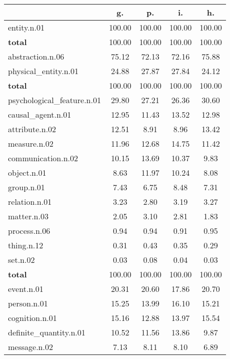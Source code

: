 \begin{table}[h!]
\begin{center}
\begin{tabular}{| l || c | c | c | c |}\hline
 & {\bf g.} & {\bf p.} & {\bf i.} & {\bf h.} \\\hline\hline
entity.n.01 & 100.00  & 100.00  & 100.00  & 100.00 \\\hline\hline
{{\bf total}} & 100.00  & 100.00  & 100.00  & 100.00 \\\hline\hline\hline
abstraction.n.06 & 75.12  & 72.13  & 72.16  & 75.88 \\\hline
physical\_entity.n.01 & 24.88  & 27.87  & 27.84  & 24.12 \\\hline\hline
{{\bf total}} & 100.00  & 100.00  & 100.00  & 100.00 \\\hline\hline\hline
psychological\_feature.n.01 & 29.80  & 27.21  & 26.36  & 30.60 \\\hline
causal\_agent.n.01 & 12.95  & 11.43  & 13.52  & 12.98 \\\hline
attribute.n.02 & 12.51  & 8.91  & 8.96  & 13.42 \\\hline
measure.n.02 & 11.96  & 12.68  & 14.75  & 11.42 \\\hline
communication.n.02 & 10.15  & 13.69  & 10.37  & 9.83 \\\hline
object.n.01 & 8.63  & 11.97  & 10.24  & 8.08 \\\hline
group.n.01 & 7.43  & 6.75  & 8.48  & 7.31 \\\hline
relation.n.01 & 3.23  & 2.80  & 3.19  & 3.27 \\\hline
matter.n.03 & 2.05  & 3.10  & 2.81  & 1.83 \\\hline
process.n.06 & 0.94  & 0.94  & 0.91  & 0.95 \\\hline
thing.n.12 & 0.31  & 0.43  & 0.35  & 0.29 \\\hline
set.n.02 & 0.03  & 0.08  & 0.04  & 0.03 \\\hline\hline
{{\bf total}} & 100.00  & 100.00  & 100.00  & 100.00 \\\hline\hline\hline
event.n.01 & 20.31  & 20.60  & 17.86  & 20.70 \\\hline
person.n.01 & 15.25  & 13.99  & 16.10  & 15.21 \\\hline
cognition.n.01 & 15.16  & 12.88  & 13.97  & 15.54 \\\hline
definite\_quantity.n.01 & 10.52  & 11.56  & 13.86  & 9.87 \\\hline
message.n.02 & 7.13  & 8.11  & 8.10  & 6.89 \\\hline

\end{tabular}
\end{center}
\end{table}
